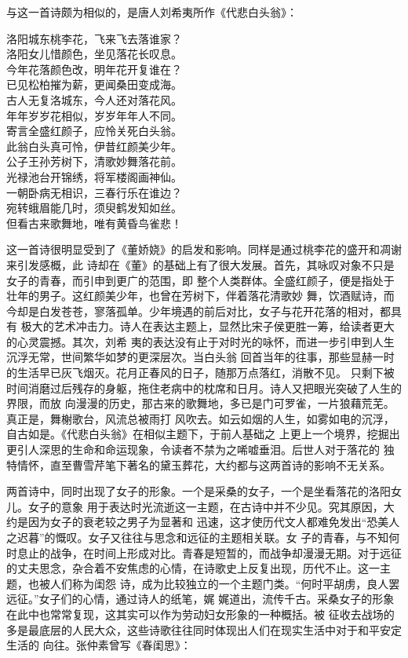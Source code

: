 		与这一首诗颇为相似的，是唐人刘希夷所作《代悲白头翁》：

		\shortpoem{}{}{}
			洛阳城东桃李花，飞来飞去落谁家？\\
			洛阳女儿惜颜色，坐见落花长叹息。\\
			今年花落颜色改，明年花开复谁在？\\
			已见松柏摧为薪，更闻桑田变成海。\\
			古人无复洛城东，今人还对落花风。\\
			年年岁岁花相似，岁岁年年人不同。\\
			寄言全盛红颜子，应怜关死白头翁。\\
			此翁白头真可怜，伊昔红颜美少年。\\
			公子王孙芳树下，清歌妙舞落花前。\\
			光禄池台开锦绣，将军楼阁画神仙。\\
			一朝卧病无相识，三春行乐在谁边？\\
			宛转蛾眉能几时，须臾鹤发知如丝。\\
			但看古来歌舞地，唯有黄昏鸟雀悲！\\
		\endshortpoem

		这一首诗很明显受到了《董娇娆》的启发和影响。同样是通过桃李花的盛开和凋谢来引发感概，此
	诗却在《董》的基础上有了很大发展。首先，其咏叹对象不只是女子的青春，而引申到更广的范围，即
	整个人类群体。全盛红颜子，便是指处于壮年的男子。这红颜美少年，也曾在芳树下，伴着落花清歌妙
	舞，饮酒赋诗，而今却是白发苍苍，寥落孤单。少年境遇的前后对比，女子与花开花落的相对，都具有
	极大的艺术冲击力。诗人在表达主题上，显然比宋子侯更胜一筹，给读者更大的心灵震撼。其次，刘希
	夷的表达没有止于对时光的咏怀，而进一步引申到人生沉浮无常，世间繁华如梦的更深层次。当白头翁
	回首当年的往事，那些显赫一时的生活早已灰飞烟灭。花月正春风的日子，随那万点落红，消散不见。
	只剩下被时间消磨过后残存的身躯，拖住老病中的枕席和日月。诗人又把眼光突破了人生的界限，而放
	向漫漫的历史，那古来的歌舞地，多已是门可罗雀，一片狼藉荒芜。真正是，舞榭歌台，风流总被雨打
	风吹去。如云如烟的人生，如雾如电的沉浮，自古如是。《代悲白头翁》在相似主题下，于前人基础之
	上更上一个境界，挖掘出更引人深思的生命和命运现象，令读者不禁为之唏嘘垂泪。后世人对于落花的
	独特情怀，直至曹雪芹笔下著名的黛玉葬花，大约都与这两首诗的影响不无关系。

		两首诗中，同时出现了女子的形象。一个是采桑的女子，一个是坐看落花的洛阳女儿。女子的意象
	用于表达时光流逝这一主题，在古诗中并不少见。究其原因，大约是因为女子的衰老较之男子为显著和
	迅速，这才使历代文人都难免发出“恐美人之迟暮”的慨叹。女子又往往与思念和远征的主题相关联。女
	子的青春，与不知何时息止的战争，在时间上形成对比。青春是短暂的，而战争却漫漫无期。对于远征
	的丈夫思念，杂合着不安焦虑的心情，在诗歌史上反复出现，历代不止。这一主题，也被人们称为闺怨
	诗，成为比较独立的一个主题门类。“何时平胡虏，良人罢远征。”女子们的心情，通过诗人的纸笔，娓
	娓道出，流传千古。采桑女子的形象在此中也常常复现，这其实可以作为劳动妇女形象的一种概括。被
	征收去战场的多是最底层的人民大众，这些诗歌往往同时体现出人们在现实生活中对于和平安定生活的
	向往。张仲素曾写《春闺思》：

